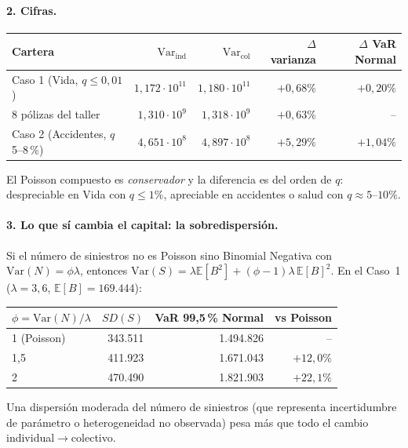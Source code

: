\documentclass[a4paper,12pt]{article}
\newcommand{\E}{\mathbb{E}}
\newcommand{\Var}{\mathrm{Var}}
\begin{document}
\paragraph{2. Cifras.}
\begin{center}
\begin{tabular}{lrrrr}
\toprule
Cartera & $\Var_{\text{ind}}$ & $\Var_{\text{col}}$ & $\Delta$ varianza & $\Delta$ VaR Normal\\
\midrule
Caso 1 (Vida, $q\le0{,}01$) & $1{,}172\cdot10^{11}$ & $1{,}180\cdot10^{11}$ & $+0{,}68\%$ & $+0{,}20\%$\\
8 p\'olizas del taller & $1{,}310\cdot10^{9}$ & $1{,}318\cdot10^{9}$ & $+0{,}63\%$ & --\\
Caso 2 (Accidentes, $q$ 5--8\,\%) & $4{,}651\cdot10^{8}$ & $4{,}897\cdot10^{8}$ & $+5{,}29\%$ & $+1{,}04\%$\\
\bottomrule
\end{tabular}
\end{center}
El Poisson compuesto es \emph{conservador} y la diferencia es del orden de $q$: despreciable en Vida con $q\le1\%$, apreciable en accidentes o salud con $q\approx5$--$10\%$.

\paragraph{3. Lo que s\'i cambia el capital: la sobredispersi\'on.} Si el n\'umero de siniestros no es Poisson sino Binomial Negativa con $\Var(N)=\phi\lambda$, entonces $\Var(S)=\lambda\E[B^2]+(\phi-1)\lambda\,\E[B]^2$. En el Caso~1 ($\lambda=3{,}6$, $\E[B]=169.444$):
\begin{center}
\begin{tabular}{lrrr}
\toprule
$\phi=\Var(N)/\lambda$ & $SD(S)$ & VaR 99,5\,\% Normal & vs Poisson\\
\midrule
1 (Poisson) & 343.511 & 1.494.826 & --\\
1,5 & 411.923 & 1.671.043 & $+12{,}0\%$\\
2 & 470.490 & 1.821.903 & $+22{,}1\%$\\
\bottomrule
\end{tabular}
\end{center}
Una dispersi\'on moderada del n\'umero de siniestros (que representa incertidumbre de par\'ametro o heterogeneidad no observada) pesa m\'as que todo el cambio individual$\to$colectivo.
\end{document}
